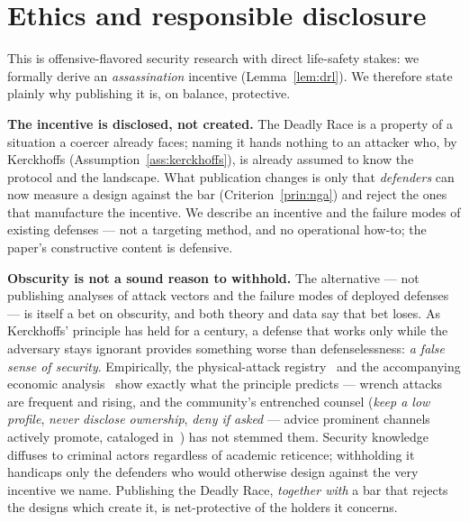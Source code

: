 \section{Ethics and responsible disclosure}
\label{sec:ethics}

This is offensive-flavored security research with direct life-safety stakes: we
formally derive an \emph{assassination} incentive (Lemma~\ref{lem:drl}). We
therefore state plainly why publishing it is, on balance, protective.

\textbf{The incentive is disclosed, not created.} The Deadly Race is a property of a
situation a coercer already faces; naming it hands nothing to an attacker who, by
Kerckhoffs (Assumption~\ref{ass:kerckhoffs}), is already assumed to know the protocol
and the landscape. What publication changes is only that \emph{defenders} can now
measure a design against the bar (Criterion~\ref{prin:nga}) and reject the ones that
manufacture the incentive. We describe an incentive and the failure modes of existing
defenses --- not a targeting method, and no operational how-to; the paper's
constructive content is defensive.

\textbf{Obscurity is not a sound reason to withhold.} The alternative --- not
publishing analyses of attack vectors and the failure modes of deployed defenses ---
is itself a bet on obscurity, and both theory and data say that bet loses.
As Kerckhoffs' principle has held for a century, a defense that works only while the
adversary stays ignorant provides something worse than defenselessness: \emph{a false sense 
of security}. Empirically, the physical-attack registry~\cite{lopp-attacks} and the 
accompanying economic analysis~\cite{gw-justification} show exactly what the principle 
predicts --- wrench attacks are frequent and rising, and the community's entrenched counsel
(\emph{keep a low profile}, \emph{never disclose ownership}, \emph{deny if asked} ---
advice prominent channels actively promote, cataloged in~\cite{gw-justification})
has not stemmed them. Security knowledge diffuses to criminal actors regardless of
academic reticence; withholding it handicaps only the defenders who would otherwise
design against the very incentive we name. Publishing the Deadly Race, \emph{together
with} a bar that rejects the designs which create it, is net-protective of the
holders it concerns.

